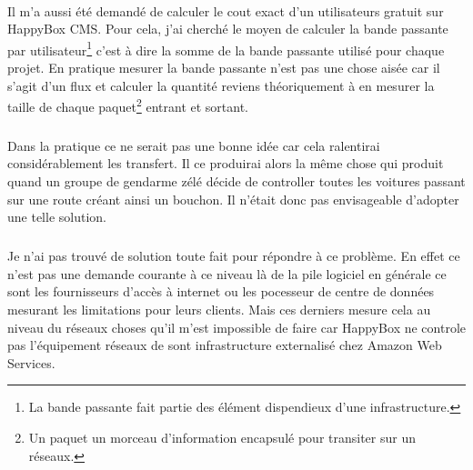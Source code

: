 \documentclass[11pt, a4paper ]{article}
\begin{document}
\begin{spacing}{1.5}
\paragraph{}
Il m'a aussi été demandé de calculer le cout exact d'un utilisateurs gratuit sur HappyBox CMS. Pour cela, j'ai cherché le moyen de calculer la bande passante par utilisateur\footnote{La bande passante fait partie des élément dispendieux d'une infrastructure.} c'est à dire la somme de la bande passante utilisé pour chaque projet. En pratique mesurer la bande passante n'est pas une chose aisée car il s'agit d'un flux et calculer la quantité reviens théoriquement à en mesurer la taille de chaque paquet\footnote{Un paquet un morceau d'information encapsulé pour transiter sur un réseaux.} entrant et sortant. 
\subparagraph{}
Dans la pratique ce ne serait pas une bonne idée car cela ralentirai considérablement les transfert. Il ce produirai alors la même chose qui produit quand un groupe de gendarme zélé décide de controller toutes les voitures passant sur une route créant ainsi un bouchon. Il n'était donc pas envisageable d'adopter une telle solution. 
\subparagraph{}
Je n'ai pas trouvé de solution toute fait pour répondre à ce problème. En effet ce n'est pas une demande courante à ce niveau là de la pile logiciel en générale ce sont les fournisseurs d'accès à internet ou les pocesseur de centre de données mesurant les limitations pour leurs clients. Mais ces derniers mesure cela au niveau du réseaux choses qu'il m'est impossible de faire car HappyBox ne controle pas l'équipement réseaux de sont infrastructure externalisé chez Amazon Web Services.


\end{spacing}
\end{document}
